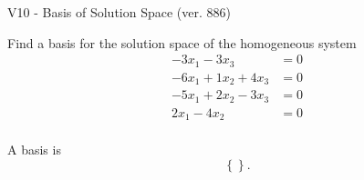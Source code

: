 \begin{exercise}
  \begin{exerciseTitle}V10 - Basis of Solution Space (ver. 886)\end{exerciseTitle}
  \begin{exerciseStatement}
    Find a basis for the solution space of the homogeneous system 
\begin{align*}
 -3 x_ 1 -3 x_ 3 &= 0  \\ 
  -6 x_ 1 + 1 x_ 2 + 4 x_ 3 &= 0  \\ 
  -5 x_ 1 + 2 x_ 2 -3 x_ 3 &= 0  \\ 
  2 x_ 1 -4 x_ 2 &= 0  \\ 
 \end{align*}


 
  \end{exerciseStatement}

  \begin{exerciseAnswer}
   A basis is   
\[\left\{\right\}.\]

  


  \end{exerciseAnswer}
\end{exercise}